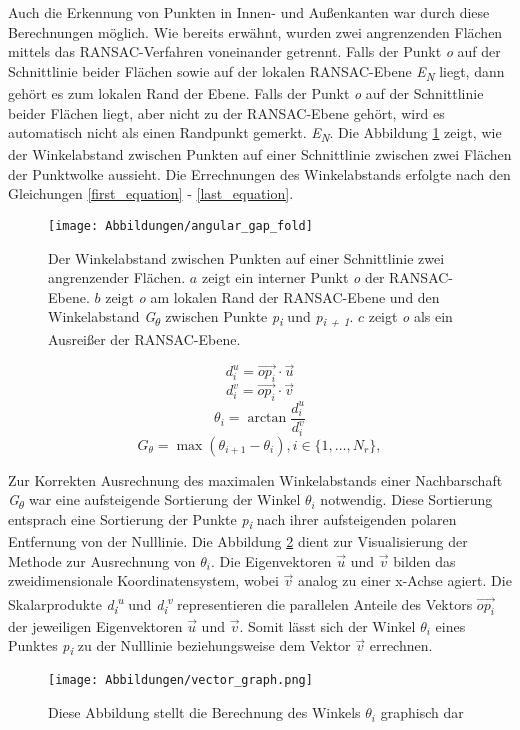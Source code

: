 Auch die Erkennung von Punkten in Innen- und Außenkanten war durch diese Berechnungen möglich. Wie bereits erwähnt, wurden zwei angrenzenden Flächen mittels das RANSAC-Verfahren voneinander getrennt. Falls der Punkt \textit{o} auf der Schnittlinie beider Flächen sowie auf der lokalen RANSAC-Ebene \textit{E\textsubscript{N}} liegt, dann gehört es zum lokalen Rand der Ebene. Falls der Punkt \textit{o} auf der Schnittlinie beider Flächen liegt, aber nicht zu der RANSAC-Ebene gehört, wird es automatisch nicht als einen Randpunkt gemerkt. \textit{E\textsubscript{N}}. Die Abbildung \ref{edge_fold} zeigt, wie der Winkelabstand zwischen Punkten auf einer Schnittlinie zwischen zwei Flächen der Punktwolke aussieht. Die Errechnungen des Winkelabstands erfolgte nach den Gleichungen \ref{first_equation} - \ref{last_equation}.

\begin{figure}[h]
	\texttt{[image: Abbildungen/angular\_gap\_fold]}
	\centering
	\caption{Der Winkelabstand zwischen Punkten auf einer Schnittlinie zwei angrenzender Flächen. \textbf{\(a\)} zeigt ein interner Punkt \textit{o} der RANSAC-Ebene. \textbf{\(b\)} zeigt \textit{o} am lokalen Rand der RANSAC-Ebene und den Winkelabstand \textit{G\textsubscript{$\theta$}} zwischen Punkte \textit{p\textsubscript{i}} und \textit{p\textsubscript{i + 1}}. \textbf{\(c\)} zeigt \textit{o} als ein Ausreißer der RANSAC-Ebene. \autocite{ni_edge_2016}}
	\label{edge_fold}
\end{figure}

\begin{equation}
\label{first_equation}
d_i^u = \vec{{op}_i} \cdot \vec{u}
\end{equation}
\begin{equation}
d_i^v = \vec{{op}_i} \cdot \vec{v}
\end{equation}
\begin{equation}
\theta_i = \arctan{\frac{d_i^u}{d_i^v}}
\end{equation}
\begin{equation}
G_\theta = \max(\theta_{i + 1} - \theta_i), i \in \{1, \ldots, N_r\},
\label{last_equation}
\end{equation}


Zur Korrekten Ausrechnung des maximalen Winkelabstands einer Nachbarschaft \textit{G\textsubscript{$\theta$}} war eine aufsteigende Sortierung der Winkel \textit{$\theta_i$} notwendig. Diese Sortierung entsprach eine Sortierung der Punkte \textit{p\textsubscript{i}} nach ihrer aufsteigenden polaren Entfernung von der Nulllinie. Die Abbildung \ref{vector_graph} dient zur Visualisierung der Methode zur Ausrechnung von $\theta_i$. Die Eigenvektoren $\vec{u}$ und $\vec{v}$ bilden das zweidimensionale Koordinatensystem, wobei $\vec{v}$ analog zu einer x-Achse agiert. Die Skalarprodukte \textit{d\textsubscript{i}\textsuperscript{u}} und \textit{d\textsubscript{i}\textsuperscript{v}} representieren die parallelen Anteile des Vektors $\vec{{op}_i}$ der jeweiligen Eigenvektoren $\vec{u}$ und $\vec{v}$. Somit lässt sich der Winkel $\theta_i$ eines Punktes \textit{p\textsubscript{i}} zu der Nulllinie beziehungsweise dem Vektor $\vec{v}$ errechnen.

\begin{figure}[t]
	\texttt{[image: Abbildungen/vector\_graph.png]}
	\centering
	\caption{Diese Abbildung stellt die Berechnung des Winkels $\theta_i$ graphisch dar}
	\label{vector_graph}
\end{figure}

